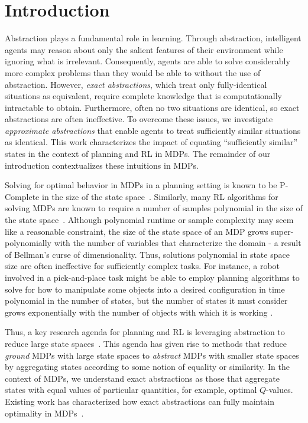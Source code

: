 \section{Introduction}
\label{sec:intro}

Abstraction plays a fundamental role in learning. Through abstraction, intelligent agents may reason about only the salient features of their environment while ignoring what is irrelevant. Consequently, agents are able to solve considerably more complex problems than they would be able to without the use of abstraction. However, \textit{exact abstractions}, which treat only fully-identical situations as equivalent, require complete knowledge that is computationally intractable to obtain. Furthermore, often no two situations are identical, so exact abstractions are often ineffective. To overcome these issues, we investigate \textit{approximate abstractions} that enable agents to treat sufficiently similar situations as identical. This work characterizes the impact of equating ``sufficiently similar'' states in the context of planning and \ac{RL} in \acp{MDP}. The remainder of our introduction contextualizes these intuitions in \acp{MDP}.

Solving for optimal behavior in \acp{MDP} in a planning setting is known to be P-Complete in the size of the state space~\cite{papadimitriou1987complexity,littman1995complexity}. Similarly, many \ac{RL} algorithms for solving \acp{MDP} are known to require a number of samples polynomial in the size of the state space~\cite{strehl2009reinforcement}. Although polynomial runtime or sample complexity may seem like a reasonable constraint, the size of the state space of an \ac{MDP} grows super-polynomially with the number of variables that characterize the domain - a result of Bellman's curse of dimensionality. Thus, solutions polynomial in state space size are often ineffective for sufficiently complex tasks. For instance, a robot involved in a pick-and-place task might be able to employ planning algorithms to solve for how to manipulate some objects into a desired configuration in time polynomial in the number of states, but the number of states it must consider grows exponentially with the number of objects with which it is working \cite{abel2015goal}.

Thus, a key research agenda for planning and \ac{RL} is leveraging abstraction to reduce large state spaces~\cite{andre2002state,jong2005state,dietterich2000hierarchical,Bean2011}. This agenda has given rise to methods that reduce \textit{ground} \acp{MDP} with large state spaces to \textit{abstract} MDPs with smaller state spaces by aggregating states according to some notion of equality or similarity. In the context of \acp{MDP}, we understand exact abstractions as those that aggregate states with equal values of particular quantities, for example, optimal $Q$-values. Existing work has characterized how exact abstractions can fully maintain optimality in \acp{MDP}~\cite{li2006towards,dean1997modelmin}. 

